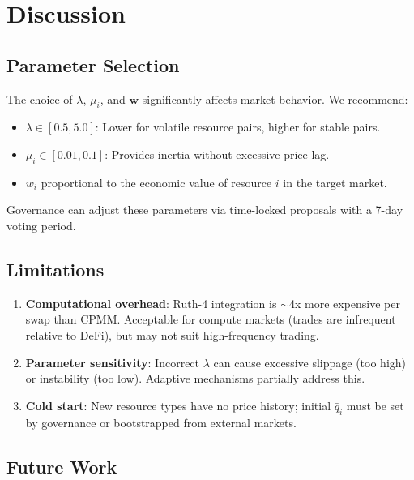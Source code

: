 \section{Discussion}

\label{sec:discussion}

\subsection{Parameter Selection}

The choice of $\lambda$, $\mu_i$, and $\bm{w}$ significantly affects market behavior. We recommend:
\begin{itemize}[leftmargin=1.1em]
    \item $\lambda \in [0.5, 5.0]$: Lower for volatile resource pairs, higher for stable pairs.
    \item $\mu_i \in [0.01, 0.1]$: Provides inertia without excessive price lag.
    \item $w_i$ proportional to the economic value of resource $i$ in the target market.
\end{itemize}

Governance can adjust these parameters via time-locked proposals with a 7-day voting period.

\subsection{Limitations}

\begin{enumerate}[leftmargin=1.4em]
    \item \textbf{Computational overhead}: Ruth-4 integration is $\sim$4x more expensive per swap than CPMM. Acceptable for compute markets (trades are infrequent relative to DeFi), but may not suit high-frequency trading.
    \item \textbf{Parameter sensitivity}: Incorrect $\lambda$ can cause excessive slippage (too high) or instability (too low). Adaptive mechanisms partially address this.
    \item \textbf{Cold start}: New resource types have no price history; initial $\bar{q}_i$ must be set by governance or bootstrapped from external markets.
\end{enumerate}

\subsection{Future Work}

